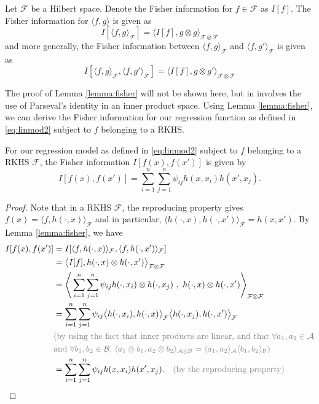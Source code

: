\begin{lemma}\label{lemma:fisher}
	Let $\mathcal F$ be a Hilbert space. Denote the Fisher information for $f \in \mathcal F$ as $I[f]$. The Fisher information for $\langle f, g \rangle$ is given as
	\[
		I[\langle f, g \rangle_{\mathcal F}] = \langle I[f], g \otimes g \rangle_{\mathcal F \otimes \mathcal F}
	\]
	and more generally, the Fisher information between $\langle f, g \rangle_{\mathcal F}$ and $\langle f, g' \rangle_{\mathcal F}$ is given as
	\[
		I[\langle f, g \rangle_{\mathcal F}, \langle f, g' \rangle_{\mathcal F}] = \langle I[f], g \otimes g' \rangle_{\mathcal F \otimes \mathcal F}
	\]
\end{lemma}

The proof of Lemma \ref{lemma:fisher} will not be shown here, but in involves the use of Parseval's identity in an inner product space. Using Lemma \ref{lemma:fisher}, we can derive the Fisher information for our regression function as defined in \eqref{eq:linmod2} subject to $f$ belonging to a RKHS.

\begin{corollary}
	For our regression model as defined in \eqref{eq:linmod2} subject to $f$ belonging to a RKHS $\mathcal F$, the Fisher information $I[f(x),f(x')]$ is given by
	\[
		I[f(x),f(x')] = \sum_{i=1}^n\sum_{j=1}^n \psi_{ij} h(x,x_i)h(x',x_j).
	\]
\end{corollary}

\begin{proof}
	Note that in a RKHS $\mathcal F$, the reproducing property gives $f(x) = \langle f, h(\cdot, x) \rangle_{\mathcal F}$ and in particular, $\langle h(\cdot,x), h(\cdot, x') \rangle_{\mathcal F} = h(x,x')$. By Lemma \ref{lemma:fisher}, we have
	\begin{align*}
		I[f(x),f(x')] &= I[\langle f, h(\cdot, x) \rangle_{\mathcal F},\langle f, h(\cdot, x') \rangle_{\mathcal F}] \\
		&= \big\langle I[f], h(\cdot, x) \otimes h(\cdot, x') \big\rangle_{\mathcal F \otimes \mathcal F} \\
		&= \Bigg\langle \sum_{i=1}^n\sum_{j=1}^n \psi_{ij} h(\cdot,x_i) \otimes h(\cdot,x_j) \ , \ h(\cdot, x) \otimes h(\cdot, x') \Bigg\rangle_{\mathcal F \otimes \mathcal F} \\
		&= \sum_{i=1}^n\sum_{j=1}^n \psi_{ij} \big\langle h(\cdot,x_i), h(\cdot, x) \big\rangle_{\mathcal F} \big\langle h(\cdot,x_j), h(\cdot, x') \big\rangle_{\mathcal F } \\
		&{\color{gray}\text{(by using the fact that inner products are linear, and that $\forall a_1, a_2 \in \mathcal A$}} \\
		&{\color{gray}\text{and $\forall b_1, b_2 \in \mathcal B$, $\langle a_1 \otimes b_1, a_2 \otimes b_2 \rangle_{\mathcal A \otimes \mathcal B} = \langle a_1, a_2 \rangle_{\mathcal A}\langle b_1, b_2 \rangle_{\mathcal B}$)}} \\
		&= \sum_{i=1}^n\sum_{j=1}^n \psi_{ij} h(x,x_i) h(x', x_j).
		\ \ \ \rlap {\color{gray}\text{(by the reproducing property)}} 
	\end{align*}
\end{proof}

